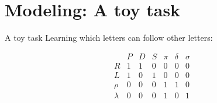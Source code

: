 \documentclass{beamer}
\begin{document}
\section{Modeling: A toy task}
\begin{frame}{A toy task}
Learning which letters can follow other letters:\vspace{-2em}
\begin{center}
\[
\begin{array}{c|cccccc} 
& P & D & S & \pi & \delta & \sigma \\
\hline
R & 1 & 1 & 0 & 0 & 0 & 0 \\
L & 1 & 0 & 1 & 0 & 0 & 0 \\
\rho & 0 & 0 & 0 & 1 & 1 & 0\\
\lambda & 0 & 0 & 0 & 1 & 0 & 1\\
\end{array} 
\]
\end{center}
\end{frame}
\end{document}
